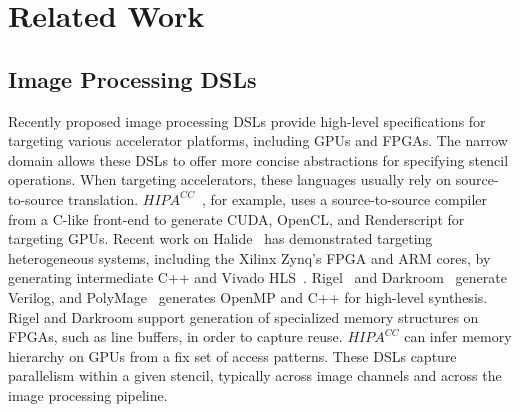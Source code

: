 \chapter{Related Work}
\label{related}

%
%
%

\section{Image Processing DSLs}
Recently proposed image processing DSLs provide high-level specifications for targeting various
accelerator platforms, including GPUs and FPGAs.%
The narrow domain allows these DSLs to offer more concise abstractions for specifying stencil operations.
When targeting accelerators, these languages usually rely on source-to-source translation.
$HIPA^{CC}$~\cite{membarth2016hipa}, for example, uses a
source-to-source compiler from a C-like front-end to generate CUDA, OpenCL, and Renderscript for
targeting GPUs.
Recent work on Halide~\cite{pldi13halide} has demonstrated targeting heterogeneous systems, including the Xilinx Zynq's FPGA and ARM cores, by generating intermediate C++ and Vivado HLS~\cite{halidefpga}.
Rigel~\cite{hegarty2016rigel} and Darkroom~\cite{hegarty2014darkroom} generate Verilog,
and PolyMage~\cite{chugh2016dsl} generates OpenMP and C++ for high-level synthesis.
Rigel and Darkroom support generation of specialized memory structures on FPGAs, such as line buffers, in order to capture
reuse. $HIPA^{CC}$ can infer memory hierarchy on GPUs from a fix set of access patterns.
These DSLs capture parallelism within a given stencil, typically across image channels
and across the image processing pipeline.

